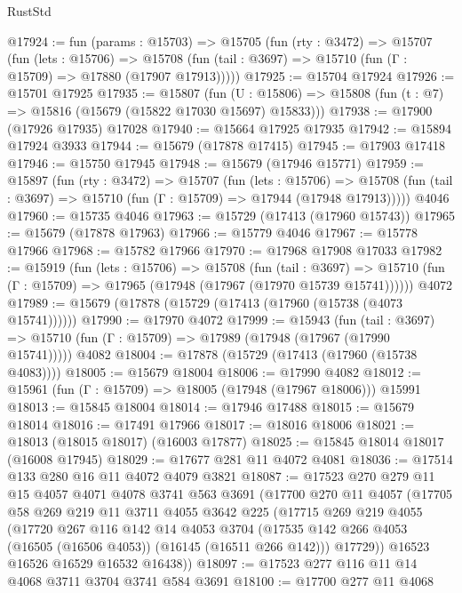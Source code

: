 \begin{lexlean}{RustStd}
\begin{coremodule}
{\begin{coremodule}
{{{{{{{{{{{{{{{{{{{{{{{{{{{{{{{{{{{{{{{{{{{{{{{@17924 := fun (params : @15703) =>
  @15705
    (fun (rty : @3472) =>
    @15707
      (fun (lets : @15706) =>
      @15708 (fun (tail : @3697) => @15710 (fun (Γ : @15709) => @17880 (@17907 @17913)))))
@17925 := @15704 @17924
@17926 := @15701 @17925
@17935 := @15807
    (fun (U : @15806) => @15808 (fun (t : @7) => @15816 (@15679 (@15822 @17030 @15697) @15833)))
@17938 := @17900 (@17926 @17935) @17028
@17940 := @15664 @17925 @17935
@17942 := @15894 @17924 @3933
@17944 := @15679 (@17878 @17415)
@17945 := @17903 @17418
@17946 := @15750 @17945
@17948 := @15679 (@17946 @15771)
@17959 := @15897
    (fun (rty : @3472) =>
    @15707
      (fun (lets : @15706) =>
      @15708 (fun (tail : @3697) => @15710 (fun (Γ : @15709) => @17944 (@17948 @17913)))))
    @4046
@17960 := @15735 @4046
@17963 := @15729 (@17413 (@17960 @15743))
@17965 := @15679 (@17878 @17963)
@17966 := @15779 @4046
@17967 := @15778 @17966
@17968 := @15782 @17966
@17970 := @17968 @17908 @17033
@17982 := @15919
    (fun (lets : @15706) =>
    @15708
      (fun (tail : @3697) =>
      @15710 (fun (Γ : @15709) => @17965 (@17948 (@17967 (@17970 @15739 @15741))))))
    @4072
@17989 := @15679 (@17878 (@15729 (@17413 (@17960 (@15738 (@4073 @15741))))))
@17990 := @17970 @4072
@17999 := @15943
    (fun (tail : @3697) => @15710 (fun (Γ : @15709) => @17989 (@17948 (@17967 (@17990 @15741)))))
    @4082
@18004 := @17878 (@15729 (@17413 (@17960 (@15738 @4083))))
@18005 := @15679 @18004
@18006 := @17990 @4082
@18012 := @15961 (fun (Γ : @15709) => @18005 (@17948 (@17967 @18006))) @15991
@18013 := @15845 @18004
@18014 := @17946 @17488
@18015 := @15679 @18014
@18016 := @17491 @17966
@18017 := @18016 @18006
@18021 := @18013 (@18015 @18017) (@16003 @17877)
@18025 := @15845 @18014 @18017 (@16008 @17945)
@18029 := @17677 @281 @11 @4072 @4081
@18036 := @17514 @133 @280 @16 @11 @4072 @4079 @3821
@18087 := @17523
    @270
    @279
    @11
    @15
    @4057
    @4071
    @4078
    @3741
    @563
    @3691
    (@17700
      @270
      @11
      @4057
      (@17705
        @58
        @269
        @219
        @11
        @3711
        @4055
        @3642
        @225
        (@17715
          @269
          @219
          @4055
          (@17720
            @267
            @116
            @142
            @14
            @4053
            @3704
            (@17535 @142 @266 @4053 (@16505 (@16506 @4053)) (@16145 (@16511 @266 @142)))
            @17729))
        @16523
        @16526
        @16529
        @16532
        @16438))
@18097 := @17523 @277 @116 @11 @14 @4068 @3711 @3704 @3741 @584 @3691
@18100 := @17700 @277 @11 @4068
}}}}}}}}}}}}}}}}}}}}}}}}}}}}}}}}}}}}}}}}}}}}}}}
\end{coremodule}}
\end{coremodule}
\end{lexlean}
